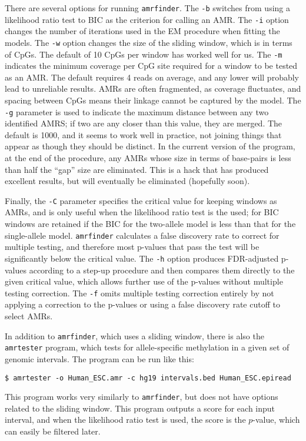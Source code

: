 \documentclass[10pt]{article}
\newcommand{\prog}[1]{\texttt{#1}}
\newcommand{\op}[1]{\texttt{#1}}
\begin{document}
{{There are several options for running \prog{amrfinder}. The \op{-b}
switches from using a likelihood ratio test to BIC as the criterion
for calling an AMR. The \op{-i} option changes the number of
iterations used in the EM procedure when fitting the models.
The \op{-w} option changes the size of the sliding
window, which is in terms of CpGs. The default of 10 CpGs per window
has worked well for us. The \op{-m} indicates the minimum coverage per
CpG site required for a window to be tested as an AMR. The default
requires 4 reads on average, and any lower will probably lead to
unreliable results. AMRs are often fragmented, as coverage fluctuates,
and spacing between CpGs means their linkage cannot be captured by the
model. The \op{-g} parameter is used to indicate the maximum distance
between any two identified AMRS; if two are any closer than this
value, they are merged. The default is 1000, and it seems to work well
in practice, not joining things that appear as though they should be
distinct. In the current version of the program, at the end of the
procedure, any AMRs whose size in terms of base-pairs is less than
half the ``gap'' size are eliminated. This is a hack that has produced
excellent results, but will eventually be eliminated (hopefully
soon).

Finally, the \op{-C} parameter specifies the critical value for
keeping windows as AMRs, and is only useful when the likelihood ratio
test is the used; for BIC windows are retained if the BIC for the
two-allele model is less than that for the single-allele model.
\prog{amrfinder} calculates a false discovery rate to correct for
multiple testing, and therefore most p-values that pass the test
will be significantly below the critical value. The \op{-h} option
produces FDR-adjusted p-values according to a step-up procedure
and then compares them directly to the given critical value, which 
allows further use of the p-values without multiple testing correction.
The \op{-f} omits multiple testing correction entirely by not applying
a correction to the p-values or using a false discovery rate cutoff
to select AMRs.

In addition to \prog{amrfinder}, which uses a sliding window, there is
also the \prog{amrtester} program, which tests for allele-specific
methylation in a given set of genomic intervals. The program can be
run like this:
\begin{verbatim}
$ amrtester -o Human_ESC.amr -c hg19 intervals.bed Human_ESC.epiread
\end{verbatim}
This program works very similarly to \prog{amrfinder}, but does not
have options related to the sliding window. This program outputs a
score for each input interval, and when the likelihood ratio test is
used, the score is the $p$-value, which can easily be filtered later.

}}
\end{document}
